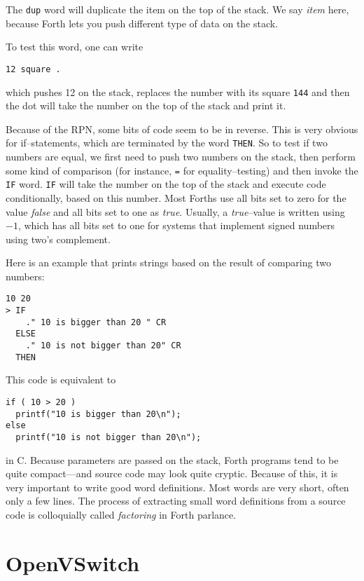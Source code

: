 The \texttt{dup} word will duplicate the item on the top of the stack.  We
say \textit{item} here, because Forth lets you push different type of data
on the stack.

To test this word, one can write 
\begin{verbatim}
12 square .
\end{verbatim}

which pushes 12 on the stack, replaces the number with its square
\texttt{144} and then the dot will take the number on the top of the stack
and print it.

Because of the \ac{RPN}, some bits of code seem to be in reverse.  This is
very obvious for if--statements, which are terminated by the word
\texttt{THEN}.  So to test if two numbers are equal, we first need to push
two numbers on the stack, then perform some kind of comparison (for
instance, \texttt{=} for equality--testing) and then invoke the
\texttt{IF} word.  \texttt{IF} will take the number on the top of the stack
and execute code conditionally, based on this number.  Most Forths use all
bits set to zero for the value \textit{false} and all bits set to one as
\textit{true}.  Usually, a \textit{true}--value is written using $-1$,
which has all bits set to one for systems that implement signed numbers
using two's complement.

Here is an example that prints strings based on the result of comparing two
numbers:

\begin{verbatim}
10 20
> IF
    ." 10 is bigger than 20 " CR
  ELSE
    ." 10 is not bigger than 20" CR
  THEN
\end{verbatim}

This code is equivalent to

\begin{verbatim}
if ( 10 > 20 )
  printf("10 is bigger than 20\n");
else
  printf("10 is not bigger than 20\n");
\end{verbatim}

in C.  Because parameters are passed on the stack, Forth programs tend to be
quite compact---and source code may look quite cryptic.  Because of this, it
is very important to write good word definitions.  Most words are very
short, often only a few lines.  The process of extracting small word
definitions from a source code is colloquially called \textit{factoring} in
Forth parlance.

\section{OpenVSwitch}

